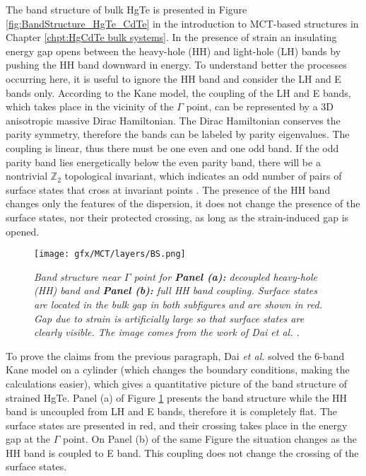 \documentclass[titlepage,a4paper]{book}
\begin{document}
The band structure of bulk HgTe is presented in Figure \ref{fig:BandStructure_HgTe_CdTe} in the introduction to MCT-based structures in Chapter \ref{chpt:HgCdTe bulk systems}. In the presence of strain an insulating energy gap opens between the heavy-hole (HH) and light-hole (LH) bands by pushing the HH band downward in energy. To understand better the processes occurring here, it is useful to ignore the HH band and consider the LH and E bands only. According to the Kane model, the coupling of the LH and E bands, which takes place in the vicinity of the $\Gamma$ point, can be represented by a 3D anisotropic massive Dirac Hamiltonian. The Dirac Hamiltonian conserves the parity symmetry, therefore the bands can be labeled by parity eigenvalues. The coupling is linear, thus there must be one even and one odd band. If the odd parity band lies energetically below the even parity band, there will be a nontrivial $\mathbb{Z}_2$ topological invariant, which indicates an odd number of pairs of surface states that cross at invariant points \cite{Dai_MCT_layers}\cite{Kane_Fu}. The presence of the HH band changes only the features of the dispersion, it does not change the presence of the surface states, nor their protected crossing, as long as the strain-induced gap is opened.
\begin{figure}[ht]
	\centering
	\texttt{[image: gfx/MCT/layers/BS.png]}
	\vspace{-10pt}
	\caption{\textit{Band structure near $\Gamma$ point for \textbf{Panel (a):} decoupled heavy-hole (HH) band and \textbf{Panel (b):} full HH band coupling. Surface states are located in the bulk gap in both subfigures and are shown in red. Gap due to strain is artificially large so that surface states are clearly visible. The image comes from the work of Dai \textit{et al.} \cite{Dai_MCT_layers}.}}
	\label{fig:BS_MCT_layers}
\end{figure} 

To prove the claims from the previous paragraph, Dai \textit{et al.} solved the 6-band Kane model on a cylinder (which changes the boundary conditions, making the calculations easier), which gives a quantitative picture of the band structure of strained HgTe. Panel (a) of Figure \ref{fig:BS_MCT_layers} presents the band structure while the HH band is uncoupled from LH and E bands, therefore it is completely flat. The surface states are presented in red, and their crossing takes place in the energy gap at the $\Gamma$ point. On Panel (b) of the same Figure the situation changes as the HH band is coupled to E band. This coupling does not change the crossing of the surface states.
\end{document}
